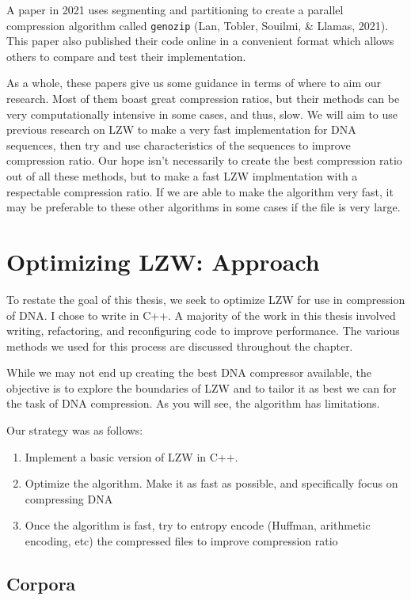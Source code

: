 \documentclass[12pt,twoside]{reedthesis}
\providecommand{\tightlist}{%
  \setlength{\itemsep}{0pt}\setlength{\parskip}{0pt}}
\begin{document}
A paper in 2021 uses segmenting and partitioning to create a parallel compression algorithm called \texttt{genozip} (Lan, Tobler, Souilmi, \& Llamas, 2021). This paper also published their code online in a convenient format which allows others to compare and test their implementation.

As a whole, these papers give us some guidance in terms of where to aim our research. Most of them boast great compression ratios, but their methods can be very computationally intensive in some cases, and thus, slow. We will aim to use previous research on LZW to make a very fast implementation for DNA sequences, then try and use characteristics of the sequences to improve compression ratio. Our hope isn't necessarily to create the best compression ratio out of all these methods, but to make a fast LZW implmentation with a respectable compression ratio. If we are able to make the algorithm very fast, it may be preferable to these other algorithms in some cases if the file is very large.

\hypertarget{optimizing-lzw-approach}{%
\chapter{Optimizing LZW: Approach}\label{optimizing-lzw-approach}}

To restate the goal of this thesis, we seek to optimize LZW for use in compression of DNA. I chose to write in C++. A majority of the work in this thesis involved writing, refactoring, and reconfiguring code to improve performance. The various methods we used for this process are discussed throughout the chapter.

While we may not end up creating the best DNA compressor available, the objective is to explore the boundaries of LZW and to tailor it as best we can for the task of DNA compression. As you will see, the algorithm has limitations.

Our strategy was as follows:
\begin{enumerate}
\def\labelenumi{\arabic{enumi}.}
\tightlist
\item
  Implement a basic version of LZW in C++.
\item
  Optimize the algorithm. Make it as fast as possible, and specifically focus on compressing DNA
\item
  Once the algorithm is fast, try to entropy encode (Huffman, arithmetic encoding, etc) the compressed files to improve compression ratio
\end{enumerate}
\hypertarget{corpora}{%
\section{Corpora}\label{corpora}}
\end{document}
